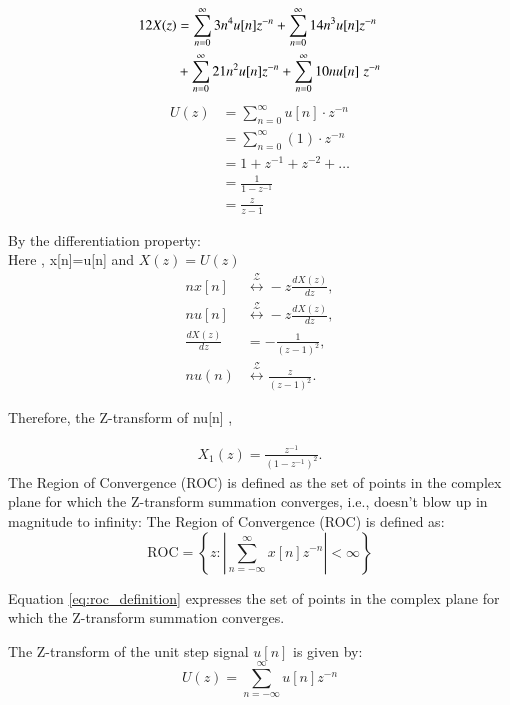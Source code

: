\documentclass[journal,12pt,twocolumn]{IEEEtran}
\theoremstyle{remark}
\begin{document}
\begin{enumerate}[label=\alph*)]
\begin{align}\label{eq:3}
    12X(z) &= \sum_{n=0}^\infty 3n^4u[n]z^{-n} +  \sum_{n=0}^\infty 14n^3u[n]z^{-n} \\ &+  \sum_{n=0}^\infty 21n^2u[n] z^{-n} +\sum_{n=0}^\infty 10nu[n]\hspace{3pt} z^{-n}\notag
\end{align}
    \begin{align}
U(z) &= \sum_{n=0}^{\infty} u[n]\cdot z^{-n} \\
     &= \sum_{n=0}^{\infty} (1) \cdot z^{-n} \\
     &= 1 + z^{-1} + z^{-2} + \ldots \\
     &= \frac{1}{1 - z^{-1}} \\
     &= \frac{z}{z - 1}
\end{align}

By the differentiation property:\\
Here , x[n]=u[n] and $X(z) = U(z)$
\begin{align}
n x[n] &\stackrel{\mathcal{Z}}{\longleftrightarrow} -z \frac{dX(z)}{dz}, \\
n u[n] &\stackrel{\mathcal{Z}}{\longleftrightarrow} -z \frac{dX(z)}{dz}, \\
\frac{dX(z)}{dz} &= -\frac{1}{(z - 1)^2}, \\
n u(n) &\stackrel{\mathcal{Z}}{\longleftrightarrow} \frac{z}{(z - 1)^2}.
\end{align}

Therefore, the Z-transform of n\cdot u[n] ,

\begin{align}
    X_1(z) = \frac{z^{-1}}{(1-z^{-1})^2}.
\end{align}
The Region of Convergence (ROC) is defined as the set of points in the complex plane for which the Z-transform summation converges, i.e., doesn't blow up in magnitude to infinity:
The Region of Convergence (ROC) is defined as:
\begin{equation}\label{eq:roc_definition}
    \text{ROC} = \left\{ z : \left| \sum_{n=-\infty}^{\infty} x[n]z^{-n} \right| < \infty \right\}
\end{equation}

Equation \eqref{eq:roc_definition} expresses the set of points in the complex plane for which the Z-transform summation converges.

The Z-transform of the unit step signal \(u[n]\) is given by:
\begin{equation}\label{eq:z_transform}
    U(z) = \sum_{n=-\infty}^{\infty} u[n] z^{-n}
\end{equation}


\end{enumerate}
\end{document}
